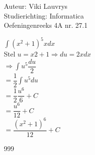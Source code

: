 \documentclass[a4paper]{article}
\begin{document}
  
\noindent \large Auteur: Viki	Lauvrys \\
\noindent \large Studierichting: Informatica\\
\noindent \large Oefeningenreeks 4A nr. 27.1\\

\medskip

\normalsize

$\displaystyle\int \left( x^2 +1 \right)^5 x dx $ \\

Stel $ u = x2 +1 \Rightarrow du = 2x  dx $ \\

$ \Rightarrow \displaystyle\int u^5 \dfrac{du}{2} $ \\

$ = \dfrac{1}{2} \displaystyle\int u^5 du $ \\

$ = \dfrac{1}{2} \dfrac{u^6}{6} + C $ \\

$ = \dfrac{u^6}{12} + C $ \\

$ = \dfrac{(x^2 +1)^6}{12} + C $ \\


\begin{thebibliography}{999}
\end{thebibliography}
\end{document}
